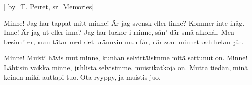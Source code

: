 [ 		
	by={T. Perret},					
	sr={Memories}]		
	
\beginverse*						
Minne! 
Jag har tappat mitt minne! 
Är jag svensk eller finne? 
Kommer inte ihåg.
Inne!
Är jag ut eller inne? 
Jag har luckor i minne, 
sån' där små alkohål. 
Men besinn' er, 
man tätar med det brännvin man får, 
när som minnet och helan går. 
\endverse						

\beginverse				
Minne!
Muisti hävis mut minne,
kunhan selvittäisimme
mitä sattunut on.
Minne!
Lähtisin vaikka minne,
juhlista selvisimme,
muistikatkoja on.
Mutta tiedän,
minä keinon mikä
auttapi tuo.
Ota ryyppy,
ja muistis juo.
\endverse				
\endsong		
